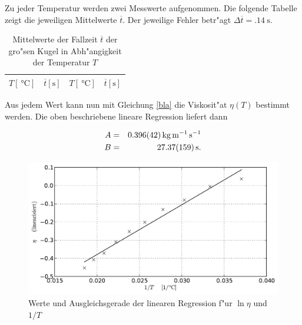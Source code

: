 		Zu jeder Temperatur werden zwei Messwerte aufgenommen. Die folgende Tabelle zeigt die jeweiligen Mittelwerte $\overline{t}$. Der jeweilige Fehler betr"agt $\Delta \overline{t} = \SI{.14}{\second}$.

		\begin{table}[h!]
			\centering
			\caption{Mittelwerte der Fallzeit $\overline{t}$ der gro"sen Kugel in Abh"angigkeit der Temperatur $T$}
			\begin{tabular}{|c|c||c|c|}
				\hline
				$T [\SI{}{\celsius}]$ & $\overline{t} [\mathrm{s}]$ & $T [\SI{}{\celsius}]$ & $\overline{t} [\mathrm{s}]$ \\
				\hline
				\hline
				
				\hline
			\end{tabular}
		\end{table}

		Aus jedem Wert kann nun mit Gleichung \eqref{bla} die Viskosit"at $\eta (T)$ bestimmt werden.
		Die oben beschriebene lineare Regression liefert dann

		\begin{eqnarray*}
			A & = & \SI{.396 (42)}{\kilo \gram \per \meter \per \second} \\
			B & = & \SI{27.37 (159)}{\second} .
		\end{eqnarray*}

		\begin{figure}[h!]
			\centering
			\includegraphics[width = 15cm]{img/plot.pdf}
			\caption{Werte und Ausgleichsgerade der linearen Regression f"ur $\ln{\eta}$ und $1 / T$}
			\label{fig:regression}
		\end{figure}

